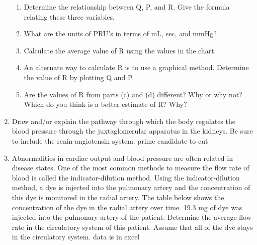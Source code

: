 \documentclass{article}
\begin{document}
\begin{enumerate}
		\begin{enumerate}
			\item Determine the relationship between Q, \textDelta P, and R. Give the formula relating these three variables.
			\item What are the units of PRU's in terms of mL, sec, and mmHg?
			\item Calculate the average value of R using the values in the chart.
			\item An alternate way to calculate R is to use a graphical method. Determine the value of R by plotting Q and \textDelta P.
			\item Are the values of R from parts (c) and (d) different? Why or why not? Which do you think is a better estimate of R? Why?
		\end{enumerate}
	\item Draw and/or explain the pathway through which the body regulates the blood pressure through the juxtaglomerular apparatus in the kidneys. Be sure to include the renin-angiotensin system. {\color{red} prime candidate to cut}
	\item Abnormalities in cardiac output and blood pressure are often related in disease states. One of the most common methods to measure the flow rate of blood is called the indicator-dilution method. Using the indicator-dilution method, a dye is injected into the pulmonary artery and the concentration of this dye is monitored in the radial artery. The table below shows the concentration of the dye in the radial artery over time. 19.3 mg of dye was injected into the pulmonary artery of the patient. Determine the average flow rate in the circulatory system of this patient. Assume that all of the dye stays in the circulatory system. {\color{red} data is in excel}
\end{enumerate}
\end{document}
